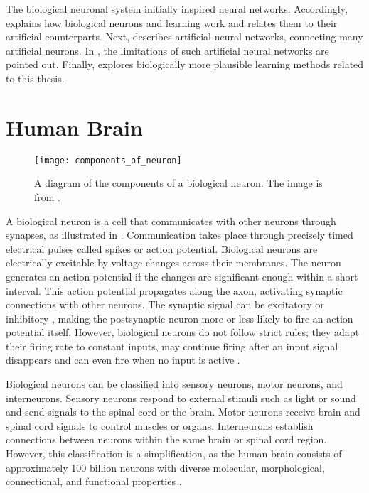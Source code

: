 The biological neuronal system initially inspired neural networks.
Accordingly,  explains how biological neurons and learning work and relates them to their artificial counterparts.
Next,   describes artificial neural networks, connecting many artificial neurons.
In , the limitations of such artificial neural networks are pointed out.
Finally,  explores biologically more plausible learning methods related to this thesis.

\section{Human Brain}
\begin{figure}[h]
    \centering
    \texttt{[image: components\_of\_neuron]}
    \caption[Diagram of the components of a biological neuron]{A diagram of the components of a biological neuron. The image is from .}
\end{figure}

A biological neuron is a cell that communicates with other neurons through synapses, as illustrated in .
Communication takes place through precisely timed electrical pulses called spikes or action potential.
Biological neurons are electrically excitable by voltage changes across their membranes.
The neuron generates an action potential if the changes are significant enough within a short interval.
This action potential propagates along the axon, activating synaptic connections with other neurons.
The synaptic signal can be excitatory  or inhibitory , making the postsynaptic neuron more or less likely to fire an action potential itself.
However, biological neurons do not follow strict rules; they adapt their firing rate to constant inputs, may continue firing after an input signal disappears and can even fire when no input is active .

Biological neurons can be classified into sensory neurons, motor neurons, and interneurons.
Sensory neurons respond to external stimuli such as light or sound and send signals to the spinal cord or the brain.
Motor neurons receive brain and spinal cord signals to control muscles or organs.
Interneurons establish connections between neurons within the same brain or spinal cord region.
However, this classification is a simplification, as the human brain consists of approximately 100 billion neurons  with diverse molecular, morphological, connectional, and functional properties .

